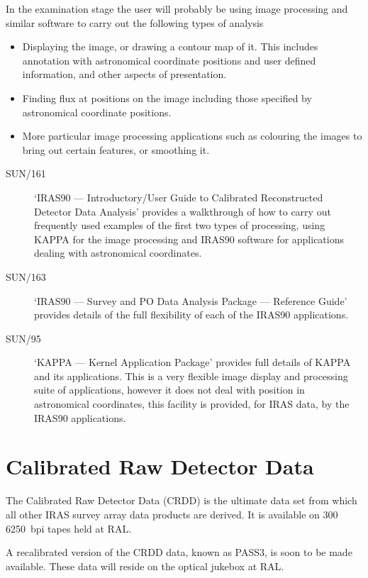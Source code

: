 In the examination stage the user will probably be using image processing and
similar software to carry out the following types of analysis
\begin{itemize}
\item Displaying the image, or drawing a contour map of it. This includes
annotation with astronomical coordinate positions and user defined information,
and other aspects of presentation.
\item Finding flux at positions on the image including those specified by
astronomical coordinate positions.
\item More particular image processing applications such as colouring the images
to bring out certain features, or smoothing it.
\end{itemize}
\begin{description}
\item [SUN/161] `IRAS90 --- Introductory/User Guide to Calibrated Reconstructed
Detector Data Analysis' provides a walkthrough of how to carry out 
frequently used examples of the first two types of processing, using KAPPA
for the image processing and IRAS90 software for applications dealing
with astronomical coordinates.
\item [SUN/163] `IRAS90 --- Survey and PO Data Analysis Package --- Reference
Guide' provides details of the full flexibility of each of the IRAS90 
applications.
\item [SUN/95] `KAPPA --- Kernel Application Package' provides full details of
KAPPA and its applications. This is a very flexible image display and processing
suite of applications, however it does not deal with position in astronomical
coordinates, this facility is provided, for IRAS data, by the IRAS90 
applications.
\end{description}

\section{Calibrated Raw Detector Data}
The Calibrated Raw Detector Data (CRDD) is the ultimate data set from which all
other IRAS survey array data products are derived.
It is available on 300 6250~bpi tapes held at RAL.

A recalibrated version of the CRDD data, known as PASS3, is soon to be made
available. These data will reside on the optical jukebox at RAL.

